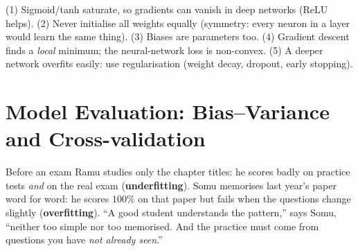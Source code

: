 \documentclass[11pt,a4paper]{article}
\begin{document}
\begin{trap}
(1) Sigmoid/tanh saturate, so gradients can vanish in deep networks (ReLU helps). (2) Never initialise all weights equally (symmetry: every neuron in a layer would learn the same thing). (3) Biases are parameters too. (4) Gradient descent finds a \emph{local} minimum; the neural-network loss is non-convex. (5) A deeper network overfits easily: use regularisation (weight decay, dropout, early stopping).
\end{trap}
\section{Model Evaluation: Bias--Variance and Cross-validation}

\begin{story}
Before an exam Ramu studies only the chapter titles: he scores badly on practice tests \emph{and} on the real exam (\textbf{underfitting}). Somu memorises last year's paper word for word: he scores $100\%$ on that paper but fails when the questions change slightly (\textbf{overfitting}). ``A good student understands the pattern,'' says Somu, ``neither too simple nor too memorised. And the practice must come from questions you have \emph{not already seen}.''
\end{story}
\end{document}
